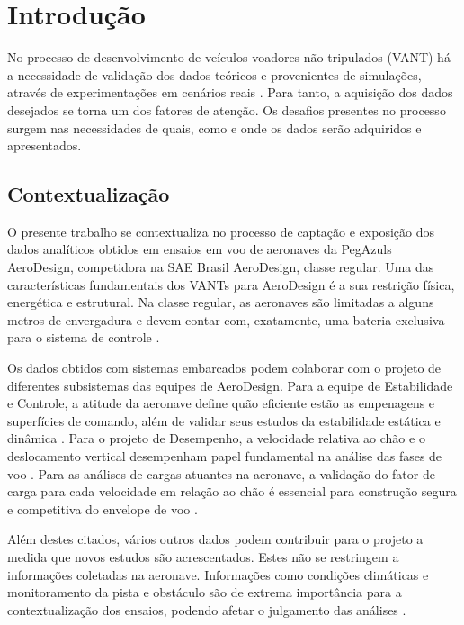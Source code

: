 \chapter{Introdução}
\label{cap:introducao}

No processo de desenvolvimento de veículos voadores não tripulados (VANT) há a necessidade de validação dos dados teóricos e provenientes de simulações, através de experimentações em cenários reais \cite{raymer_aircraft_design}. Para tanto, a aquisição dos dados desejados se torna um dos fatores de atenção. Os desafios presentes no processo surgem nas necessidades de quais, como e onde os dados serão adquiridos e apresentados.

\section{Contextualização}

O presente trabalho se contextualiza no processo de captação e exposição dos dados analíticos obtidos em ensaios em voo de aeronaves da PegAzuls AeroDesign, competidora na SAE Brasil AeroDesign, classe regular. Uma das características fundamentais dos VANTs para AeroDesign é a sua restrição física, energética e estrutural. Na classe regular, as aeronaves são limitadas a alguns metros de envergadura e devem contar com, exatamente, uma bateria exclusiva para o sistema de controle \cite{regulamento-sae-aerodesign-2026}.

Os dados obtidos com sistemas embarcados podem colaborar com o projeto de diferentes subsistemas das equipes de AeroDesign. Para a equipe de Estabilidade e Controle, a atitude da aeronave define quão eficiente estão as empenagens e superfícies de comando, além de validar seus estudos da estabilidade estática e dinâmica \cite{raymer_aircraft_design}. Para o projeto de Desempenho, a velocidade relativa ao chão e o deslocamento vertical desempenham papel fundamental na análise das fases de voo \cite{raymer_aircraft_design}. Para as análises de cargas atuantes na aeronave, a validação do fator de carga para cada velocidade em relação ao chão é essencial para construção segura e competitiva do envelope de voo \cite{raymer_aircraft_design}. 

Além destes citados, vários outros dados podem contribuir para o projeto a medida que novos estudos são acrescentados. Estes não se restringem a informações coletadas na aeronave. Informações como condições climáticas e monitoramento da pista e obstáculo são de extrema importância para a contextualização dos ensaios, podendo afetar o julgamento das análises \cite{raymer_aircraft_design}.

